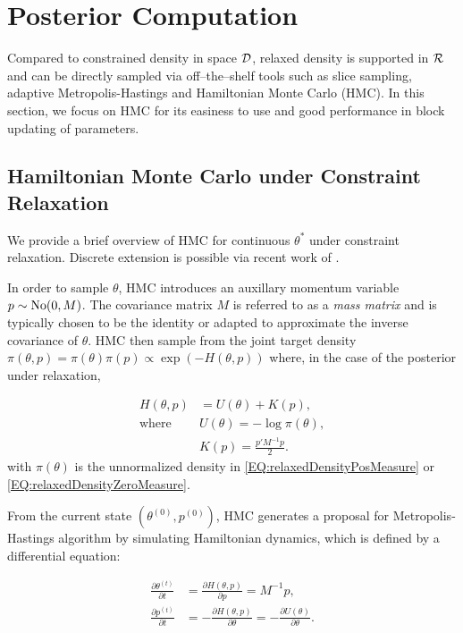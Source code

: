 \documentclass[10pt,fleqn]{article} \pdfoutput=1
\DeclareMathOperator{\1}{\mathbbm{1}} \DeclareMathOperator{\bigO}{\mc O}
\newcommand{\mass}{M} %
\begin{document}
\section{Posterior Computation}

Compared to constrained density in  space $\mathcal{D}$, relaxed density is supported in $\mathcal{R}$ and can be directly 
sampled via off--the--shelf tools such as slice
sampling, adaptive Metropolis-Hastings and Hamiltonian Monte Carlo (HMC).
In this section, we focus on HMC for its easiness to use and good
performance in block updating of parameters.

\subsection{Hamiltonian Monte Carlo under Constraint Relaxation}

We provide a brief overview of HMC for continuous $\theta^*$ under
constraint relaxation. Discrete extension is possible via recent work of
\cite{nishimura2017discontinuous}.

In order to sample $\theta$, HMC introduces an auxillary momentum variable $p
	\sim \No(0, \mass)$. The covariance matrix $\mass$ is referred to as a
\textit{mass matrix} and is typically chosen to be the identity or adapted
to approximate the inverse covariance of $\theta$. HMC then sample from the
joint target density $\pi(\theta, p) = \pi(\theta) \pi(p) \propto \exp (- H(\theta, p))$
where, in the case of the posterior under relaxation,


\begin{equation} \begin{aligned}
		H(\theta, p) & = U(\theta)+K(p), \\ \text{where } &
		U(\theta) = -\log\pi(\theta),    \\ & K(p) = \frac{p'\mass^{-1} p}{2}.
	\end{aligned}
\end{equation}
with $\pi(\theta)$ is the unnormalized density in \eqref{EQ:relaxedDensityPosMeasure} or \eqref{EQ:relaxedDensityZeroMeasure}.

From the current state $(\theta^{(0)},p^{(0)})$, HMC generates a proposal for
Metropolis-Hastings algorithm by simulating Hamiltonian dynamics, which is
defined by a differential equation:

\begin{equation} \begin{aligned} \label{hamiltonian} \frac{\partial \theta
		^{(t)}}{\partial t} & =\frac{\partial H(\theta, p)}{\partial p} =
		\mass^{-1}p,                                                 \\ \frac{\partial p^{(t)}}{\partial t}&
		=-\frac{\partial H(\theta, p)}{\partial \theta} = -\frac{\partial
			U(\theta)}{\partial \theta}.\end{aligned} \end{equation}
\end{document}
